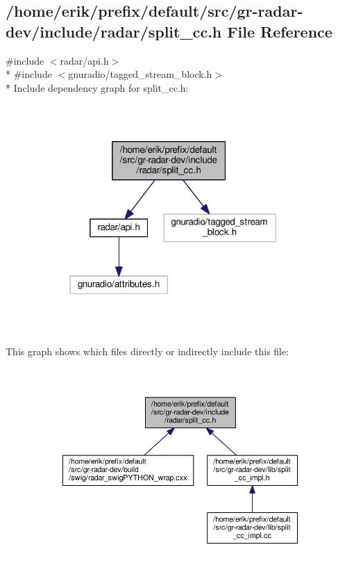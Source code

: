 \subsection{/home/erik/prefix/default/src/gr-\/radar-\/dev/include/radar/split\+\_\+cc.h File Reference}
\label{split__cc_8h}
{\ttfamily \#include $<$radar/api.\+h$>$}\\*
{\ttfamily \#include $<$gnuradio/tagged\+\_\+stream\+\_\+block.\+h$>$}\\*
Include dependency graph for split\+\_\+cc.\+h\+:
\nopagebreak
\begin{figure}[H]
\begin{center}
\leavevmode
\includegraphics[width=302pt]{d2/df0/split__cc_8h__incl}
\end{center}
\end{figure}
This graph shows which files directly or indirectly include this file\+:
\nopagebreak
\begin{figure}[H]
\begin{center}
\leavevmode
\includegraphics[width=350pt]{d0/d9b/split__cc_8h__dep__incl}
\end{center}
\end{figure}
